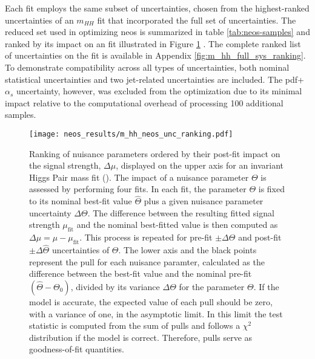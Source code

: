 Each fit employs the same subset of uncertainties, chosen from the highest-ranked uncertainties of an $m_{HH}$ fit that incorporated the full set of uncertainties. The reduced set used in optimizing \ac{neos} is summarized in table \ref{tab:neos-samples} and ranked by its impact on an \mhh fit illustrated in Figure \ref{fig:m_hh_neos_unc_ranking} . The complete ranked list of uncertainties on the \mhh fit is available in Appendix \ref{fig:m_hh_full_sys_ranking}. To demonstrate compatibility across all types of uncertainties, both nominal statistical uncertainties and two jet-related uncertainties are included. The \ac{pdf}+$\alpha_s$ uncertainty, however, was excluded from the optimization due to its minimal impact relative to the computational overhead of processing 100 additional samples.


\begin{figure}
    \centering
    \texttt{[image: neos\_results/m\_hh\_neos\_unc\_ranking.pdf]}
    \caption[]{Ranking of nuisance parameters ordered by their post-fit impact on the signal strength, $\Delta\mu$, displayed on the upper axis for an invariant Higgs Pair mass fit (\mhh{}). The impact of a nuisance parameter $\Theta$ is assessed by performing four fits. In each fit, the parameter $\Theta$ is fixed to its nominal best-fit value $\hat{\Theta}$ plus a given nuisance parameter uncertainty $\Delta\Theta$. The difference between the resulting fitted signal strength $\mu_\text{fit}$ and the nominal best-fitted value is then computed as $\Delta\mu=\hat{\mu} - \mu_\text{fit}$. This process is repeated for pre-fit $\pm\Delta\Theta$ and post-fit $\pm\Delta\hat{\Theta}$ uncertainties of $\Theta$. The lower axis and the black points represent the pull for each nuisance paramter, calculated as the difference between the best-fit value and the nominal pre-fit $(\hat{\Theta} - \Theta_0)$, divided by its variance $\Delta\Theta$ for the parameter $\Theta$. If the model is accurate, the expected value of each pull should be zero, with a variance of one, in the asymptotic limit. In this limit the test statistic is computed from the sum of pulls and follows a $\chi^2$ distribution if the model is correct. Therefore, pulls serve as goodness-of-fit quantities. }
    \label{fig:m_hh_neos_unc_ranking}
\end{figure}

